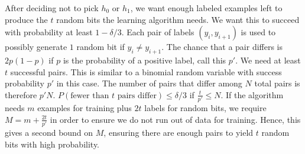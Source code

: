 \documentclass[11pt]{article}
\DeclareMathOperator{\1}{\mathbbm{1}}
\begin{document}
\begin{problem}
\begin{enumerate}
After deciding not to pick $h_0$ or $h_1$, we want enough labeled examples left to produce the $t$ random bits the learning algorithm needs. We want this to succeed with probability at least $1- \delta/3$. Each pair of labels $(y_i, y_{i+1})$ is used to possibly generate $1$ random bit if $y_i \neq y_{i + 1}$. The chance that a pair differs is $2p(1-p)$ if $p$ is the probability of a positive label, call this $p'$. We need at least $t$ successful pairs. This is similar to a binomial random variable with success probability $p'$ in this case. The number of pairs that differ among $N$ total pairs is therefore $p'N$. $P(\text{fewer than }t \text{ pairs differ}) \leq \delta/3$ if $\frac{t}{p'} \leq N$. If the algorithm needs $m$ examples for training plus $2t$ labels for random bits, we require $M=m + \frac{2t}{p'}$ in order to ensure we do not run out of data for training. Hence, this gives a second bound on $M$, ensuring there are enough pairs to yield $t$ random bits with high probability.
\end{enumerate}
\end{problem}
\end{document}
